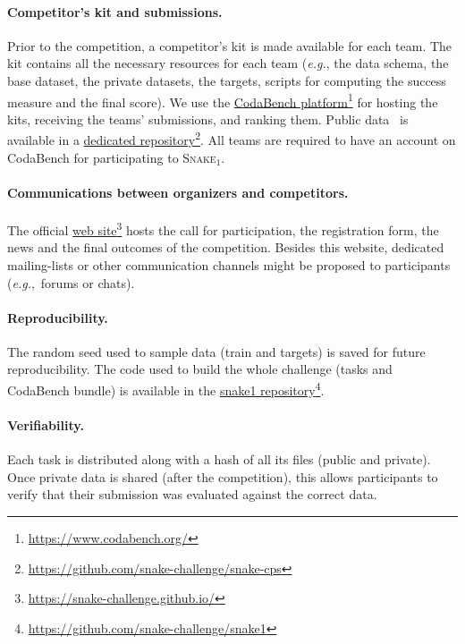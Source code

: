 \documentclass{article}
\newcommand{\myhref}[2]{\href{#1}{#2}\footnote{\url{#1}}}
\newcommand{\name}{\textsc{Snake}\xspace}
\begin{document}
\paragraph{Competitor's kit and submissions.}
Prior to the competition, a competitor's kit is made available for each team.
The kit contains all the necessary resources for each team (\emph{e.g.}, the data schema, the base dataset, the private datasets, the targets, scripts for computing the success measure and the final score).
We use the \myhref{https://www.codabench.org/}{CodaBench platform} for hosting the kits, receiving the teams' submissions, and ranking them. %
Public data~\cite{beziaud_louis_2023_7858326} is available in a \myhref{https://github.com/snake-challenge/snake-cps}{dedicated repository}.
All teams are required to have an account on CodaBench for participating to \name$_1$.

\paragraph{Communications between organizers and competitors.}
The official \myhref{https://snake-challenge.github.io/}{web site} hosts the call for participation, the registration form, the news and the final outcomes of the competition.
Besides this website, dedicated mailing-lists or other communication channels might be proposed to participants (\emph{e.g.},~forums or chats).


\paragraph{Reproducibility.} The random seed used to sample data (train and targets) is saved for future reproducibility.
The code used to build the whole challenge (tasks and CodaBench bundle) is available in the \myhref{https://github.com/snake-challenge/snake1}{snake1 repository}.

\paragraph{Verifiability.} Each task is distributed along with a hash of all its files (public and private). Once private data is shared (after the competition), this allows participants to verify that their submission was evaluated against the correct data.
\end{document}
